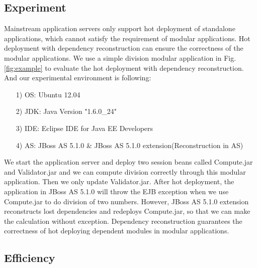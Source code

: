 \documentclass[conference]{IEEEtran}
\begin{document}
\subsection{Experiment}
Mainstream application servers only support hot deployment of standalone applications, which cannot satisfy the requirement of modular applications.
Hot deployment with dependency reconstruction can ensure the correctness of the modular applications.
We use a simple division modular application in Fig.\ref{fig:example} to evaluate the hot deployment with dependency reconstruction.
And our experimental environment is following:
\begin{itemize}[]
\item[1)] OS: Ubuntu 12.04
\item[2)] JDK: Java Version "1.6.0\_24"
\item[3)] IDE: Eclipse IDE for Java EE Developers
\item[4)] AS: JBoss AS 5.1.0 \& JBoss AS 5.1.0 extension(Reconstruction in AS)
\end{itemize}

We start the application server and deploy two session beans called Compute.jar and Validator.jar and we can compute division correctly through this modular application.
Then we only update Validator.jar.
After hot deployment, the application in JBoss AS 5.1.0 will throw the EJB exception when we use Compute.jar to do division of two numbers.
However, JBoss AS 5.1.0 extension reconstructs lost dependencies and redeploys Compute.jar, so that we can make the calculation without exception.
Dependency reconstruction guarantees the correctness of hot deploying dependent modules in modular applications.

\subsection{Efficiency}
\end{document}

